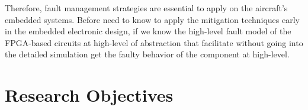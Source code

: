 %
Therefore, fault management strategies are essential to apply on the aircraft's embedded systems. Before need to know to apply the mitigation techniques early in the embedded electronic design, if we know the high-level fault model of the FPGA-based circuits at high-level of abstraction that facilitate without going into the detailed simulation get the faulty behavior of the component at high-level.
  




\section{Research Objectives}

